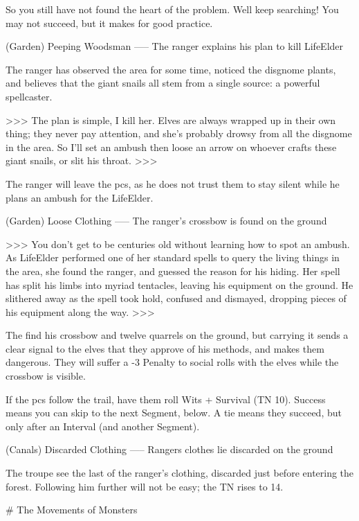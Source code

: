 \begin{speechtext}
  So you still have not found the heart of the problem.
  Well keep searching!
  You may not succeed, but it makes for good practice.
\end{speechtext}

(Garden) Peeping Woodsman
-----
{The ranger explains his plan to kill LifeElder}

The ranger has observed the area for some time, noticed the disgnome plants, and believes that the giant snails all stem from a single source: a powerful spellcaster.

>>>
The plan is simple, I kill her.
Elves are always wrapped up in their own thing; they never pay attention, and she's probably drowsy from all the disgnome in the area.
So I'll set an ambush then loose an arrow on whoever crafts these giant snails, or slit his throat.
>>>

The ranger will leave the \glspl{pc}, as he does not trust them to stay silent while he plans an ambush for the LifeElder.

(Garden) Loose Clothing
-----
{The ranger's crossbow is found on the ground}

>>>
You don't get to be centuries old without learning how to spot an ambush.
As LifeElder performed one of her standard spells to query the living things in the area, she found the ranger, and guessed the reason for his hiding.
Her spell has split his limbs into myriad tentacles, leaving his equipment on the ground.
He slithered away as the spell took hold, confused and dismayed, dropping pieces of his equipment along the way.
>>>

The find his crossbow and twelve quarrels on the ground, but carrying it sends a clear signal to the elves that they approve of his methods, and makes them dangerous.
They will suffer a -3 Penalty to social rolls with the elves while the crossbow is visible.

If the \glspl{pc} follow the trail, have them roll Wits + Survival (TN 10).
Success means you can skip to the next Segment, below.
A tie means they succeed, but only after an Interval (and another Segment).

(Canals) Discarded Clothing
-----
{Rangers clothes lie discarded on the ground}

The troupe see the last of the ranger's clothing, discarded just before entering the forest.
Following him further will not be easy; the TN rises to 14.

# The Movements of Monsters

